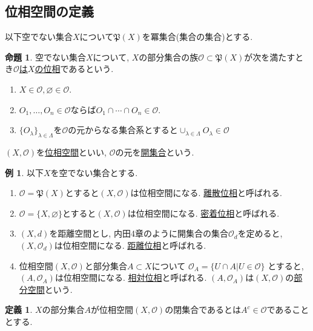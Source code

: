 \documentclass[dvipdfmx,a4paper,11pt]{article}
\theoremstyle{definition}
\newtheorem{prop}[thm]{命題}
\newtheorem{dfn}[thm]{定義}
\newtheorem{exa}[thm]{例}
\begin{document}
\subsection{位相空間の定義}
以下空でない集合$X$について$\mathfrak{P}(X)$を冪集合(集合の集合)とする.
\begin{tcolorbox}[
    colback = white,
    colframe = green!35!black,
    fonttitle = \bfseries,
    breakable = true]
    \begin{prop}
    \text{}
    空でない集合$X$について, $X$の部分集合の族$\mathscr{O} \subset \mathfrak{P}(X)$が次を満たすとき\underline{$\mathscr{O} $は$X$の位相}であるという.
     \begin{enumerate}
      \setlength{\parskip}{0cm} 
  \setlength{\itemsep}{0cm} 
    \item $X \in \mathscr{O}, \varnothing \in \mathscr{O}$.
    \item $O_1, \ldots, O_n \in \mathscr{O}$ならば$O_1 \cap \cdots \cap O_n \in \mathscr{O}$.
    \item $\{ O_{\lambda} \}_{\lambda \in \Lambda }$を$\mathscr{O}$の元からなる集合系とすると$
    \cup_{ \lambda \in \Lambda  }O_{\lambda} \in \mathscr{O}$
    \end{enumerate}
$(X, \mathscr{O})$を\underline{位相空間}といい, $\mathscr{O}$の元を\underline{開集合}という.
  \end{prop}
 \end{tcolorbox}
 \begin{exa}
 以下$X$を空でない集合とする.
 \begin{enumerate}
 \item $\mathscr{O}=\mathfrak{P}(X)$とすると$(X, \mathscr{O})$は位相空間になる. \underline{離散位相}と呼ばれる.
 \item $\mathscr{O}=\{X, \varnothing \}$とすると$(X, \mathscr{O})$は位相空間になる. \underline{密着位相}と呼ばれる.
 \item $(X,d)$を距離空間とし, 内田4章のように開集合の集合$\mathscr{O}_d$を定めると, $(X, \mathscr{O}_d)$は位相空間になる. \underline{距離位相}と呼ばれる.
 \item 位相空間$(X, \mathscr{O})$と部分集合$A \subset X$について
 $
 \mathscr{O}_A = \{ U \cap A | U \in \mathscr{O}\}
 $
 とすると, $(A,  \mathscr{O}_A)$は位相空間になる. \underline{相対位相}と呼ばれる.
 $(A,  \mathscr{O}_A)$は$(X, \mathscr{O})$の\underline{部分空間}という.
 \end{enumerate}
  \end{exa}


\begin{tcolorbox}[
    colback = white,
    colframe = green!35!black,
    fonttitle = \bfseries,
    breakable = true]
    \begin{dfn}
    $X$の部分集合$A$が位相空間$(X, \mathscr{O} )$の閉集合であるとは$A^c \in \mathscr{O} $であることとする.
  \end{dfn}
 \end{tcolorbox}
 
\end{document}
